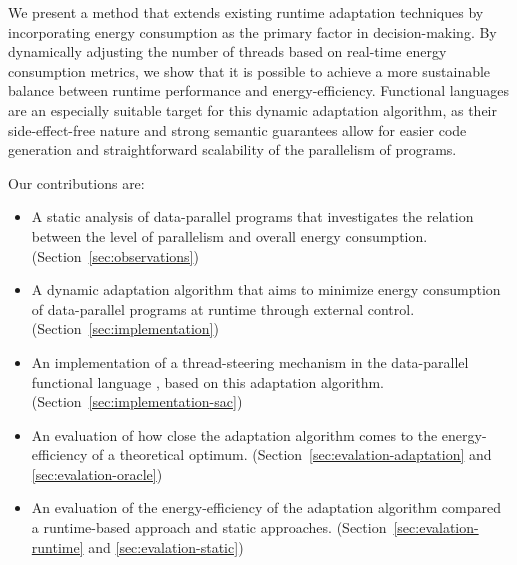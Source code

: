 We present a method that extends existing runtime adaptation techniques by incorporating energy
consumption as the primary factor in decision-making. By dynamically adjusting the number of threads
based on real-time energy consumption metrics, we show that it is possible to achieve a more
sustainable balance between runtime performance and energy-efficiency. Functional languages are an
especially suitable target for this dynamic adaptation algorithm, as their side-effect-free nature
and strong semantic guarantees allow for easier code generation and straightforward scalability of
the parallelism of programs.

Our contributions are:
\begin{itemize}
    \item A static analysis of data-parallel programs that investigates the relation between the
    level of parallelism and overall energy consumption. (Section~\ref{sec:observations})
    \item A dynamic adaptation algorithm that aims to minimize energy consumption of data-parallel
    programs at runtime through external control. (Section~\ref{sec:implementation})
    \item An implementation of a thread-steering mechanism in the data-parallel functional language
    \sac{}, based on this adaptation algorithm. (Section~\ref{sec:implementation-sac})
    \item An evaluation of how close the adaptation algorithm comes to the energy-efficiency of a
    theoretical optimum. (Section~\ref{sec:evalation-adaptation} and \ref{sec:evalation-oracle})
    \item An evaluation of the energy-efficiency of the adaptation algorithm compared a
    runtime-based approach and static approaches. (Section~\ref{sec:evalation-runtime} and
    \ref{sec:evalation-static})
\end{itemize}
